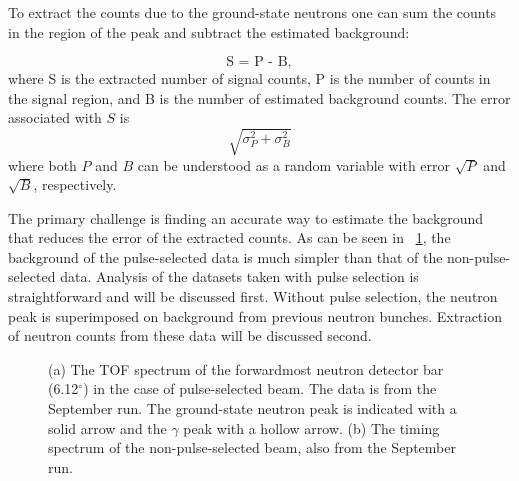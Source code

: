 To extract the counts due to the ground-state neutrons one can sum the counts in the region of the peak and subtract the estimated background:

\begin{equation}
\text{S = P - B},
\label{eq:counts}
\end{equation}
where S is the extracted number of signal counts, P is the number of counts in the signal region, and B is the number of estimated background counts.  The error associated with $S$ is
\begin{equation}
\sqrt{\sigma_{P}^2 + \sigma_{B}^2}
\label{eq:errDef}
\end{equation}
where both $P$ and $B$ can be understood as a random variable with error $\sqrt{P}$ and $\sqrt{B}$, respectively.

The primary challenge is finding an accurate way to estimate the background that reduces the error of the extracted counts.  As can be seen in {\fig}~\ref{fig:PSvsNPS}, the background of the pulse-selected data is much simpler than that of the non-pulse-selected data.  Analysis of the datasets taken with pulse selection is straightforward and will be discussed first.  Without pulse selection, the neutron peak is superimposed on background from previous neutron bunches.  Extraction of neutron counts from these data will be discussed second.
\begin{figure}[!htbp]
\centering
{}
\caption{(a) The TOF spectrum of the forwardmost neutron detector bar (6.12$^{\circ}$) in the case of pulse-selected beam.  The data is from the September run.  The ground-state neutron peak is indicated with a solid arrow and the $\gamma$ peak with a hollow arrow. (b) The timing spectrum of the  non-pulse-selected beam, also from the September run.}
\label{fig:PSvsNPS}
\end{figure}

